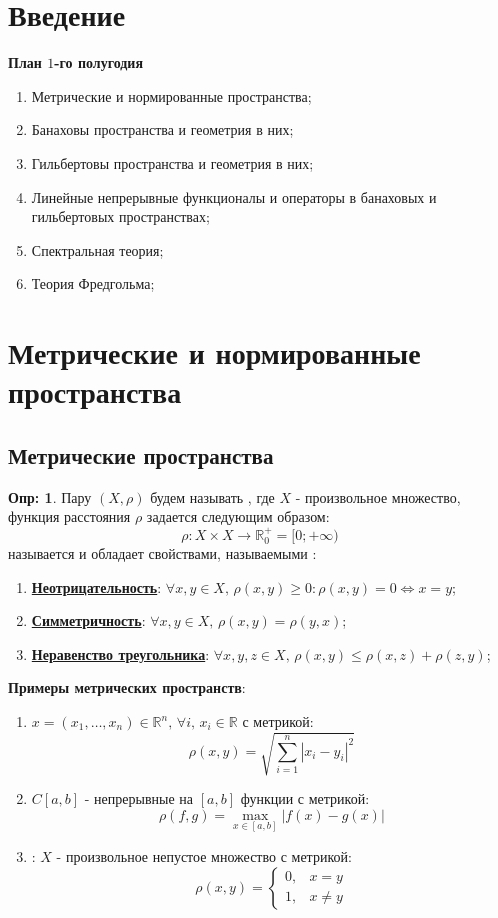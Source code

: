 \documentclass[12pt]{article}
\newcommand{\RN}[1]{%
	\textup{\uppercase\expandafter{\romannumeral#1}}%
}
\newcommand{\MR}{\mathbb{R}}
\theoremstyle{definition}
\newtheorem{defn}{Опр:}
\newcommand{\ddsum}[2]{\displaystyle\sum\limits_{#1}^{#2}}
\begin{document}
\lhead{Функциональный анализ-\RN{1}}

\section*{Введение}
\textbf{План $1$-го полугодия}
\begin{enumerate}[label=\arabic*)]
	\item Метрические и нормированные пространства;
	\item Банаховы пространства и геометрия в них;
	\item Гильбертовы пространства и геометрия в них;
	\item Линейные непрерывные функционалы и операторы в банаховых и гильбертовых пространствах;
	\item Спектральная теория;
	\item Теория Фредгольма;
\end{enumerate}

\section*{Метрические и нормированные пространства}
\subsection*{Метрические пространства}
\begin{defn}
	Пару $(X,\rho)$ будем называть , где $X$ - произвольное множество, функция расстояния $\rho$ задается следующим образом:
	$$
		\rho \colon X\times X \to \MR^{+}_0 = [0; +\infty)
	$$
	называется  и обладает свойствами, называемыми :
	\begin{enumerate}[label=\arabic*)]
		\item \textbf{\uline{Неотрицательность}}: $\forall x,y \in X, \, \rho(x,y) \geq 0 \colon \rho(x,y) = 0 \Leftrightarrow x = y$;
		\item \textbf{\uline{Симметричность}}: $\forall x,y \in X, \, \rho(x,y) = \rho(y,x)$;
		\item \textbf{\uline{Неравенство треугольника}}: $\forall x,y,z \in X, \, \rho(x,y) \leq \rho(x,z) + \rho(z,y)$;
	\end{enumerate}
\end{defn}

\textbf{Примеры метрических пространств}:
\begin{enumerate}[label=\arabic*)]
	\item $x = (x_1,\dotsc,x_n) \in \MR^n, \, \forall i, \, x_i\in \MR$ с метрикой:
	$$
		\rho(x,y) = \sqrt{\ddsum{i = 1}{n}|x_i - y_i|^2}
	$$ 
	\item $C[a,b]$ - непрерывные на $[a,b]$ функции с метрикой:
	$$
		\rho(f,g) = \max\limits_{x \in [a,b]}|f(x) - g(x)|
	$$
	\item {}: $X$ - произвольное непустое множество с метрикой:
	$$
		\rho(x,y) = 
		\begin{cases}
			0, & x = y \\
			1, & x \neq y
		\end{cases}
	$$
\end{enumerate}
\newpage
\end{document}
